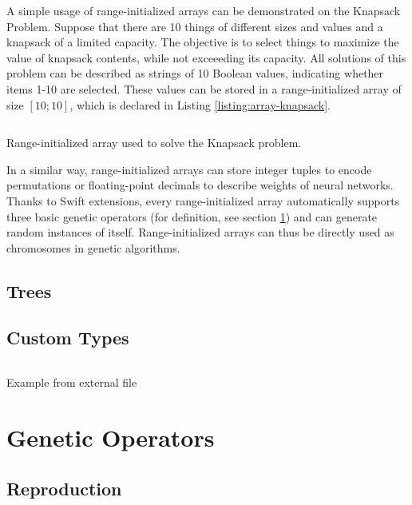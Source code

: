 A simple usage of range-initialized arrays can be demonstrated on the Knapsack Problem. Suppose that there are 10 things of different sizes and values and a knapsack of a limited capacity. The objective is to select things to maximize the value of knapsack contents, while not exceeeding its capacity. All solutions of this problem can be described as strings of 10 Boolean values, indicating whether items 1-10 are selected. These values can be stored in a range-initialized array of size $[10;10]$, which is declared in Listing \ref{listing:array-knapsack}.

\begin{listing}[ht]
	\inputminted{swift}{../code/array-knapsack.swift}
	\caption{Range-initialized array used to solve the Knapsack problem.}
	\label{listing:array-knapsack}
\end{listing}

In a similar way, range-initialized arrays can store integer tuples to encode permutations or floating-point decimals to describe weights of neural networks. Thanks to Swift extensions, every range-initialized array automatically supports three basic genetic operators (for definition, see section \ref{section:genetic-operators}) and can generate random instances of itself. Range-initialized arrays can thus be directly used as chromosomes in genetic algorithms.



\subsection{Trees}
\todo

\subsection{Custom Types}
\todo

\begin{listing}[ht]
\inputminted{swift}{../code/vector-sample.swift}
\caption{Example from external file}
\label{listing:3}
\end{listing}

\section{Genetic Operators}\label{section:genetic-operators}
\todo

\subsection{Reproduction}
\todo

